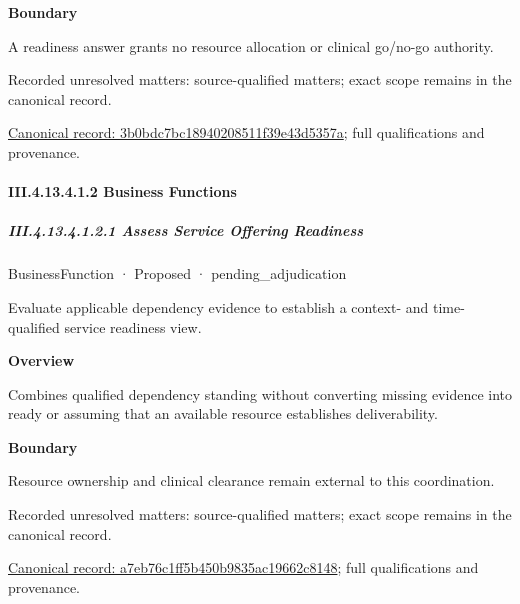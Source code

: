 \textbf{Boundary}



A readiness answer grants no resource allocation or clinical go/no-go authority.


{\small Recorded unresolved matters: source-qualified matters; exact scope remains in the canonical record.}\par
{\footnotesize \href{../../../../../../../../continuum/business/business-service/3b0bdc7bc18940208511f39e43d5357a.md}{Canonical record: 3b0bdc7bc18940208511f39e43d5357a}; full qualifications and provenance.}\par
\paragraph*{III.4.13.4.1.2 Business Functions}
\label{navigation:III.4.13.4.1.2}

\subparagraph*{III.4.13.4.1.2.1 Assess Service Offering Readiness}
\label{navigation:III.4.13.4.1.2.1}

\label{element:a7eb76c1ff5b450b9835ac19662c8148}
{\small BusinessFunction · Proposed · pending\_adjudication}\par

Evaluate applicable dependency evidence to establish a context- and time-qualified service readiness view.



\textbf{Overview}



Combines qualified dependency standing without converting missing evidence into ready or assuming that an available resource establishes deliverability.



\textbf{Boundary}



Resource ownership and clinical clearance remain external to this coordination.


{\small Recorded unresolved matters: source-qualified matters; exact scope remains in the canonical record.}\par
{\footnotesize \href{../../../../../../../../continuum/business/business-function/a7eb76c1ff5b450b9835ac19662c8148.md}{Canonical record: a7eb76c1ff5b450b9835ac19662c8148}; full qualifications and provenance.}\par
